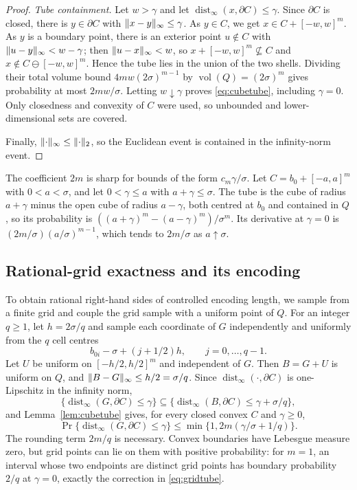 \begin{proof}
\emph{Tube containment.} Let $w>\gamma$ and let
$\operatorname{dist}_\infty(x,\partial C)\le\gamma$. Since $\partial C$ is
closed, there is $y\in\partial C$ with $\lVert x-y\rVert_\infty\le\gamma$. As
$y\in C$, we get $x\in C+[-w,w]^m$. As $y$ is a boundary point, there is
an exterior point $u\notin C$ with $\lVert u-y\rVert_\infty<w-\gamma$; then
$\lVert u-x\rVert_\infty<w$, so $x+[-w,w]^m\not\subseteq C$ and
$x\notin C\ominus[-w,w]^m$. Hence the tube lies in the union of the two
shells. Dividing their total volume bound $4mw(2\sigma)^{m-1}$ by
$\operatorname{vol}(Q)=(2\sigma)^m$ gives probability at most $2mw/\sigma$.
Letting $w\downarrow\gamma$ proves \eqref{eq:cubetube}, including
$\gamma=0$. Only closedness and convexity of $C$ were used, so unbounded
and lower-dimensional sets are covered.

Finally, $\lVert\cdot\rVert_\infty\le\lVert\cdot\rVert_2$, so the Euclidean event
is contained in the infinity-norm event.
\end{proof}
The coefficient $2m$ is sharp for bounds of the form $c_m\gamma/\sigma$.
Let $C=b_0+[-a,a]^m$ with $0<a<\sigma$, and let $0<\gamma\le a$ with
$a+\gamma\le\sigma$. The tube is the cube of radius $a+\gamma$ minus the
open cube of radius $a-\gamma$, both centred at $b_0$ and contained in $Q$,
so its probability is $((a+\gamma)^m-(a-\gamma)^m)/\sigma^m$. Its
derivative at $\gamma=0$ is $(2m/\sigma)(a/\sigma)^{m-1}$, which tends to
$2m/\sigma$ as $a\uparrow\sigma$.

\subsection{Rational-grid exactness and its encoding}
To obtain rational right-hand sides of controlled encoding length, we
sample from a finite grid and couple the grid sample with a uniform point
of $Q$. For an integer $q\ge1$, let $h=2\sigma/q$ and sample each
coordinate of $G$ independently and uniformly from the $q$ cell centres
\begin{equation}\label{eq:centergrid}
 b_{0i}-\sigma+(j+1/2)h,\qquad j=0,\ldots,q-1.
\end{equation}
Let $U$ be uniform on $[-h/2,h/2]^m$ and independent of $G$. Then
$B=G+U$ is uniform on $Q$, and $\lVert B-G\rVert_\infty\le h/2=\sigma/q$.
Since $\operatorname{dist}_\infty(\cdot,\partial C)$ is one-Lipschitz in
the infinity norm,
\[
 \{\operatorname{dist}_\infty(G,\partial C)\le\gamma\}\subseteq
 \{\operatorname{dist}_\infty(B,\partial C)\le\gamma+\sigma/q\},
\]
and Lemma~\ref{lem:cubetube} gives, for every closed convex $C$ and
$\gamma\ge0$,
\begin{equation}\label{eq:gridtube}
 \Pr\{\operatorname{dist}_\infty(G,\partial C)\le\gamma\}
       \le\min\{1,2m(\gamma/\sigma+1/q)\}.
\end{equation}
The rounding term $2m/q$ is necessary. Convex boundaries have Lebesgue
measure zero, but grid points can lie on them with positive probability:
for $m=1$, an interval whose two endpoints are distinct grid points has
boundary probability $2/q$ at $\gamma=0$, exactly the correction in
\eqref{eq:gridtube}.

